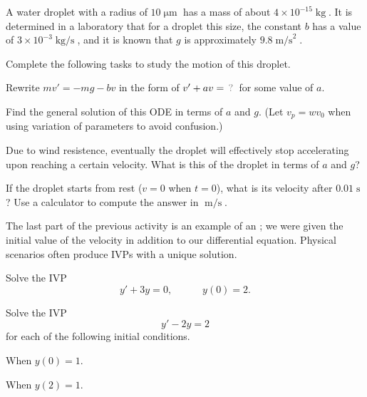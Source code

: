 \begin{applicationActivities}
\begin{activity}{20}
A water droplet with a radius of \(10\operatorname{\mu m}\) has a mass of about \(4 \times 10^{-15}\operatorname{kg}\).  
It is determined in a laboratory that for a droplet this size, the constant \(b\) has a value of \(3\times 10^{-3}\operatorname{kg/s}\),
and it is known that \(g\) is approximately \(9.8\operatorname{m/s}^2\).

\vfill

Complete the following tasks to study the motion of this droplet.
\begin{subactivity}
Rewrite \(mv'=-mg-bv\) in the form of \(v'+av=\unknown\) for some value of \(a\).
\end{subactivity}
\begin{subactivity}
Find the general solution of this ODE in terms of \(a\) and \(g\). 
(Let \(v_p=wv_0\) when using variation of parameters to avoid confusion.)
\end{subactivity}
\begin{subactivity}
Due to wind resistence, eventually the droplet will effectively stop accelerating upon reaching a certain velocity.
What is this  of the droplet in terms of \(a\) and \(g\)?
\end{subactivity}
\begin{subactivity}
If the droplet starts from rest (\(v=0\) when \(t=0\)), what is its velocity after \(0.01\operatorname{s}\)?
Use a calculator to compute the answer in \(\operatorname{m/s}\).
\end{subactivity}
\end{activity}

\begin{definition}
The last part of the previous activity is an example of an ; we were given the initial value of the velocity in addition to our differential equation.
\vfill
Physical scenarios often produce IVPs with a unique solution.
\end{definition}

\begin{activity}{10}
Solve the IVP
\[y'+3y=0,\hspace{3em} y(0)=2.\]
\end{activity}

\begin{activity}{15}
Solve the IVP \[y'-2y=2\]
for each of the following initial conditions.
\begin{subactivity}
When \(y(0)=1\).
\end{subactivity}
\begin{subactivity}
When \(y(2)=1\).
\end{subactivity}
\end{activity}




\end{applicationActivities}
